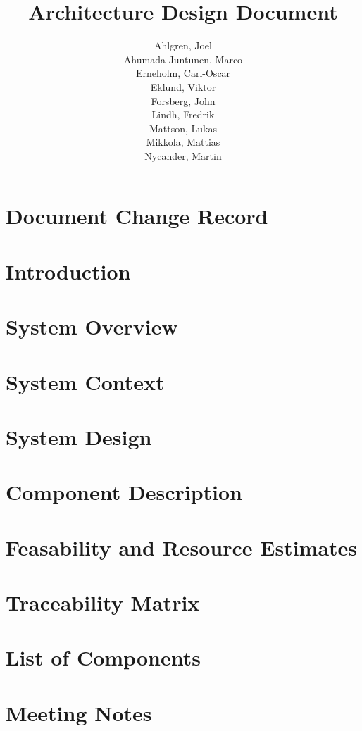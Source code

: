 \documentclass[a4paper,twoside,11pt,titlepage]{article}
\title{Architecture Design Document}
\author{
	\small Ahlgren, Joel \\
	\small Ahumada Juntunen, Marco \\
	\small Erneholm, Carl-Oscar \\
	\small Eklund, Viktor \\
	\small Forsberg, John \\
	\small Lindh, Fredrik \\
	\small Mattson, Lukas \\
	\small Mikkola, Mattias  \\
	\small Nycander, Martin
}
\begin{document}
\ifpdf
{}
\else
{}
\fi

\maketitle

\begin{abstract}
	
\end{abstract}
\newpage

\toc
\cleardoublepagetwo
\setcounter{page}{1}
\startfooter
\section*{Document Change Record}

\cleardoublepage

\section{Introduction}

\cleardoublepage

\section{System Overview}

\cleardoublepage

\section{System Context}

\cleardoublepage


\section{System Design}

\cleardoublepage

\section{Component Description}

\cleardoublepage

\section{Feasability and Resource Estimates}

\cleardoublepage

\section{Traceability Matrix}

\cleardoublepage

\section{List of Components}
\listofreq

\cleardoublepage
\appendix

\section{Meeting Notes}


\newpage
\end{document}
